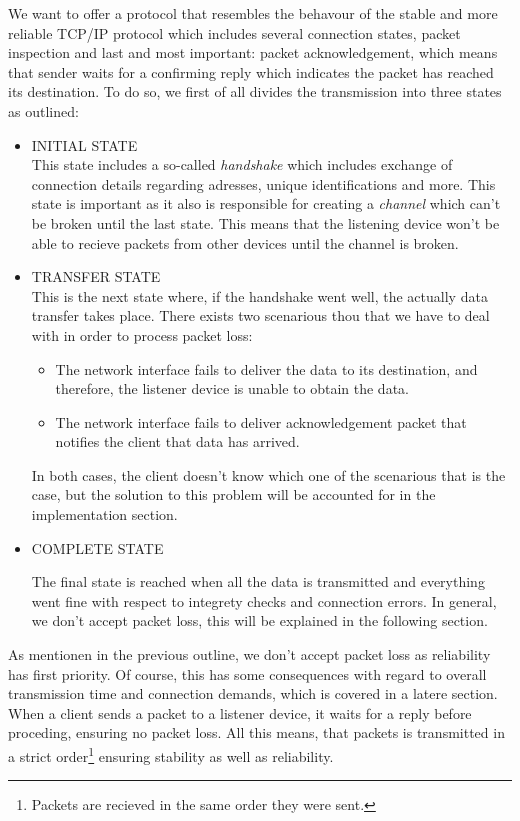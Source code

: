 \documentclass{article}
\begin{document}
	We want to offer a protocol that resembles the behavour of the stable and more reliable TCP/IP protocol which includes several connection states, packet inspection and last and most important: packet acknowledgement, which means that sender waits for a confirming reply which indicates the packet has reached its destination. To do so, we first of all divides the transmission into three states as outlined:
	
	\begin{itemize}
		\item INITIAL STATE\\
		This state includes a so-called \textit{handshake} which includes exchange of connection details regarding adresses, unique identifications and more. This state is important as it also is responsible for creating a \textit{channel} which can't be broken until the last state. This means that the listening device won't be able to recieve packets from other devices until the channel is broken.
		
		\item TRANSFER STATE\\
		This is the next state where, if the handshake went well, the actually data transfer takes place. There exists two scenarious thou that we have to deal with in order to process packet loss:
		\begin{itemize}
			\item The network interface fails to deliver the data to its destination, and therefore, the listener device is unable to obtain the data.
			\item The network interface fails to deliver acknowledgement packet that notifies the client that data has arrived.
		\end{itemize}
		
		In both cases, the client doesn't know which one of the scenarious that is the case, but the solution to this problem will be accounted for in the implementation section.
		
		\item COMPLETE STATE
		
		The final state is reached when all the data is transmitted and everything went fine with respect to integrety checks and connection errors. In general, we don't accept packet loss, this will be explained in the following section. 
	\end{itemize}
	
	As mentionen in the previous outline, we don't accept packet loss as reliability has first priority. Of course, this has some consequences with regard to overall transmission time and connection demands, which is covered in a latere section. When a client sends a packet to a listener device, it waits for a reply before proceding, ensuring no packet loss. All this means, that packets is transmitted in a strict order\footnote{Packets are recieved in the same order they were sent.} ensuring stability as well as reliability.\\
	
\end{document}
